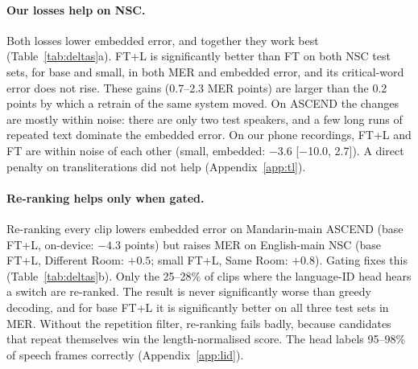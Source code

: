 \paragraph{Our losses help on NSC.}
Both losses lower embedded error, and together they work best (Table~\ref{tab:deltas}a). FT+L is significantly better than FT on both NSC test sets, for base and small, in both MER and embedded error, and its critical-word error does not rise. These gains (0.7--2.3 MER points) are larger than the 0.2 points by which a retrain of the same system moved. On ASCEND the changes are mostly within noise: there are only two test speakers, and a few long runs of repeated text dominate the embedded error. On our phone recordings, FT+L and FT are within noise of each other (small, embedded: $-$3.6 [$-$10.0, 2.7]). A direct penalty on transliterations did not help (Appendix~\ref{app:tl}).

\paragraph{Re-ranking helps only when gated.}
Re-ranking every clip lowers embedded error on Mandarin-main ASCEND (base FT+L, on-device: $-4.3$ points) but raises MER on English-main NSC (base FT+L, Different Room: $+0.5$; small FT+L, Same Room: $+0.8$). Gating fixes this (Table~\ref{tab:deltas}b). Only the 25--28\% of clips where the language-ID head hears a switch are re-ranked. The result is never significantly worse than greedy decoding, and for base FT+L it is significantly better on all three test sets in MER. Without the repetition filter, re-ranking fails badly, because candidates that repeat themselves win the length-normalised score. The head labels 95--98\% of speech frames correctly (Appendix~\ref{app:lid}).
